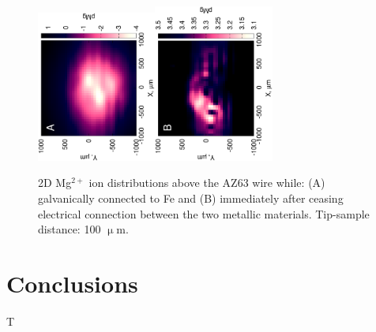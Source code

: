 \documentclass[3p]{elsarticle}
\begin{document}
\def\s{0.35}
\begin{figure}
\centering
\includegraphics[trim = 10mm 20mm 0mm 10mm, clip, width=\s\textwidth, angle=-90]{17012501.eps}\includegraphics[trim = 10mm 20mm 0mm 10mm, clip, width=\s\textwidth, angle=-90]{17012503_deconvoluted.eps}
\caption{2D Mg$^{2+}$ ion distributions above the AZ63 wire while: (A) galvanically connected to Fe and (B) immediately after ceasing electrical connection between the two metallic materials. Tip-sample distance: 100 $\upmu$m.}
\label{fig:2d}
\end{figure}





\section{Conclusions}

T
\end{document}
